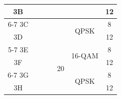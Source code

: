 \begin{table}[htbp]
\begin{tabular}{|c|c|c|c|c|c|c|}
3B & & & & & & 12 \\
\cline{6-7}
3C & & & & & \multirow{2}{*}{QPSK} & 8 \\
3D & & & & & & 12 \\
\cline{5-7}
3E & & & & \multirow{4}{*}{20} & \multirow{2}{*}{16-QAM} & 8 \\
3F & & & & & & 12 \\
\cline{6-7}
3G & & & & & \multirow{2}{*}{QPSK} & 8 \\
3H & & & & & & 12 \\
\bottomrule
\end{tabular}

\vspace{4pt}

\end{table}



